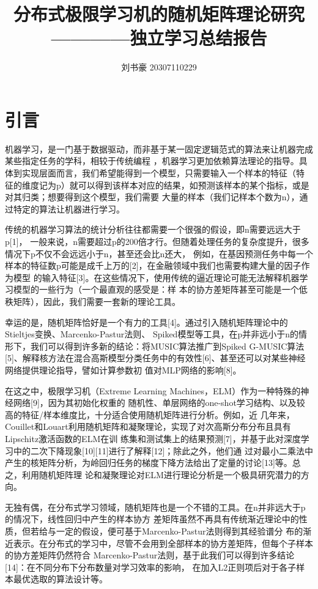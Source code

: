 \documentclass[UTF8,12pt]{ctexart}
\begin{document}
\title{分布式极限学习机的随机矩阵理论研究 \\ \large {————独立学习总结报告}}
\author{刘书豪 20307110229}
\date{}
\maketitle

\tableofcontents

\section{引言}
机器学习，是一门基于数据驱动，而非基于某一固定逻辑范式的算法来让机器完成某些指定任务的学科，相较于传统编程
，机器学习更加依赖算法理论的指导。具体到实现层面而言，我们希望能得到一个模型，只需要输入一个样本的特征（特
征的维度记为p）就可以得到该样本对应的结果，如预测该样本的某个指标，或是对其归类；想要得到这个模型，我们需要
大量的样本（我们记样本个数为n），通过特定的算法让机器进行学习。

传统的机器学习算法的统计分析往往都需要一个很强的假设，即n需要远远大于p[1]，
一般来说，n需要超过p的200倍才行。但随着处理任务的复杂度提升，很多情况下p不仅不会远远小于n，甚至还会比n还大，
例如，在基因预测任务中每一个样本的特征数p可能是成千上万的[2]，在金融领域中我们也需要构建大量的因子作为模型
的输入特征[3]。在这些情况下，使用传统的逼近理论可能无法解释机器学习模型的一些行为（一个最直观的感受是：样
本的协方差矩阵甚至可能是一个低秩矩阵），因此，我们需要一套新的理论工具。

幸运的是，随机矩阵恰好是一个有力的工具[4]。通过引入随机矩阵理论中的Stieltjes变换、Marcenko-Pastur法则、
Spiked模型等工具，在p并非远小于n的情形下，我们可以得到许多新的结论：将MUSIC算法推广到Spiked G-MUSIC算法
[5]、解释核方法在混合高斯模型分类任务中的有效性[6]、甚至还可以对某些神经网络提供理论指导，譬如计算参数初
值对MLP网络的影响[8]。

在这之中，极限学习机（Extreme Learning Machines，ELM）作为一种特殊的神经网络[9]，因为其初始化权重的
随机性、单层网络的one-shot学习结构、以及较高的特征/样本维度比，十分适合使用随机矩阵进行分析。例如，近
几年来，Couillet和Louart利用随机矩阵和凝聚理论，实现了对次高斯分布分布且具有Lipschitz激活函数的ELM在训
练集和测试集上的结果预测[7]，并基于此对深度学习中的二次下降现象[10][11]进行了解释[12]；除此之外，他们通
过对最小二乘法中产生的核矩阵分析，为岭回归任务的梯度下降方法给出了定量的讨论[13]等。总之，利用随机矩阵理
论和凝聚理论对ELM进行理论分析是一个极具研究潜力的方向。

无独有偶，在分布式学习领域，随机矩阵也是一个不错的工具。在n并非远大于p的情况下，线性回归中产生的样本协方
差矩阵虽然不再具有传统渐近理论中的性质，但若给与一定的假设，便可基于Marcenko-Pastur法则得到其经验谱分
布的渐近表示。在分布式的学习中，尽管不会用到全部样本的协方差矩阵，但每个子样本的协方差矩阵仍然符合
Marcenko-Pastur法则，基于此我们可以得到许多结论[14]：在不同分布下分布数量对学习效率的影响，
在加入L2正则项后对于各子样本最优选取的算法设计等。
\end{document}
